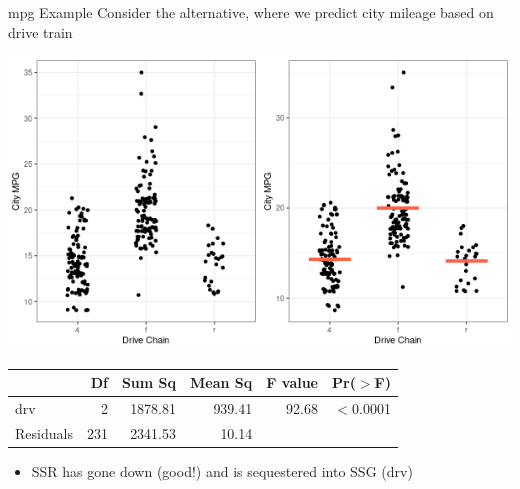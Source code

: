 \documentclass{beamer}
\begin{document}
\begin{frame}{mpg Example}
\footnotesize
Consider the alternative, where we predict city mileage based on drive train
\begin{center}
\includegraphics[scale=0.44]{ctympg2.png}
\end{center}
\begin{table}[ht]
\centering
\begin{tabular}{lrrrrr}
  \hline
 & Df & Sum Sq & Mean Sq & F value & Pr($>$F) \\ 
  \hline
drv         & 2 & 1878.81 & 939.41 & 92.68 & $<$0.0001 \\ 
  Residuals   & 231 & 2341.53 & 10.14 &  &  \\ 
   \hline
\end{tabular}
\end{table}
\begin{itemize}
    \item SSR has gone down (good!) and is sequestered into SSG (drv)
\end{itemize}
\end{frame}
\end{document}
